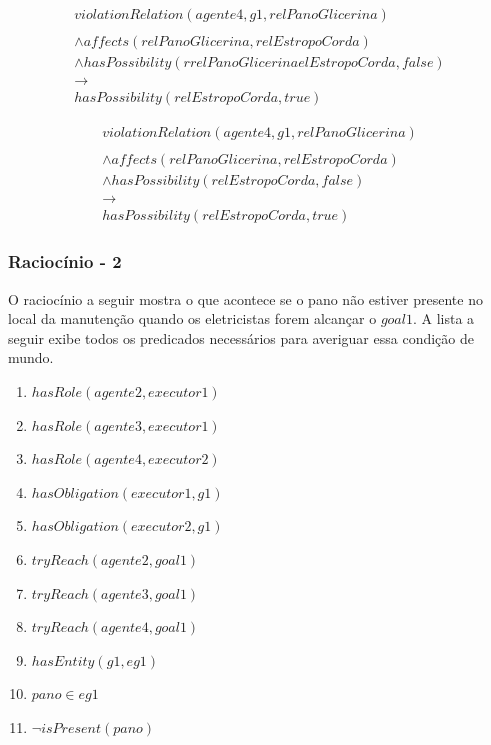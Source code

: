\documentclass[12pt]{article}
\begin{document}
\begin{eqnarray}\nonumber
	violationRelation(agente4,g1,relPanoGlicerina)  \nonumber \\ 
	\nonumber \\ 
	\wedge affects(relPanoGlicerina,relEstropoCorda)   \nonumber \\ 
	\wedge hasPossibility(rrelPanoGlicerinaelEstropoCorda,false) \nonumber \\  
	\to \nonumber \\  
	hasPossibility(relEstropoCorda,true) 
\end{eqnarray}

\begin{eqnarray}\nonumber
	violationRelation(agente4,g1,relPanoGlicerina)  \nonumber \\ 
	\nonumber \\ 
	\wedge affects(relPanoGlicerina,relEstropoCorda)   \nonumber \\ 
	\wedge hasPossibility(relEstropoCorda,false) \nonumber \\  
	\to \nonumber \\  
	hasPossibility(relEstropoCorda,true) 
\end{eqnarray}



\subsubsection{Raciocínio - 2} 

O raciocínio a seguir mostra o que acontece se o pano não estiver presente no local da manutenção quando os eletricistas forem alcançar o $goal1$. A lista a seguir exibe todos os predicados necessários para averiguar essa condição de mundo. 


\begin{enumerate}
	\item $hasRole(agente2,executor1)$ 
	\item $hasRole(agente3,executor1)$	 	
	\item $hasRole(agente4,executor2)$	 
	\item $hasObligation(executor1,g1)$
	\item $hasObligation(executor2,g1)$
	\item $tryReach(agente2,goal1)$ 
	\item $tryReach(agente3,goal1)$	 	
	\item $tryReach(agente4,goal1)$	
	\item $hasEntity(g1,eg1)$		
	\item $pano \in eg1$
	\item $\neg isPresent(pano)$
\end{enumerate}
\end{document}
